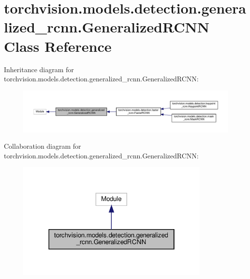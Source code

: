 \hypertarget{classtorchvision_1_1models_1_1detection_1_1generalized__rcnn_1_1GeneralizedRCNN}{}\section{torchvision.\+models.\+detection.\+generalized\+\_\+rcnn.\+Generalized\+R\+C\+NN Class Reference}
\label{classtorchvision_1_1models_1_1detection_1_1generalized__rcnn_1_1GeneralizedRCNN}


Inheritance diagram for torchvision.\+models.\+detection.\+generalized\+\_\+rcnn.\+Generalized\+R\+C\+NN\+:
\nopagebreak
\begin{figure}[H]
\begin{center}
\leavevmode
\includegraphics[width=350pt]{classtorchvision_1_1models_1_1detection_1_1generalized__rcnn_1_1GeneralizedRCNN__inherit__graph}
\end{center}
\end{figure}


Collaboration diagram for torchvision.\+models.\+detection.\+generalized\+\_\+rcnn.\+Generalized\+R\+C\+NN\+:
\nopagebreak
\begin{figure}[H]
\begin{center}
\leavevmode
\includegraphics[width=274pt]{classtorchvision_1_1models_1_1detection_1_1generalized__rcnn_1_1GeneralizedRCNN__coll__graph}
\end{center}
\end{figure}
